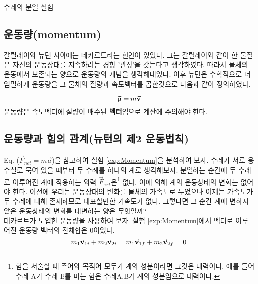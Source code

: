 \begin{flushleft}
\begin{exper}{ \Large {수레의 분열 실험} }
\begin{enumerate}
\end{enumerate}
\end{exper}


\subsection{운동량(momentum)}


갈릴레이와 뉴턴 사이에는 데카르트라는 현인이 있었다. 그는 갈릴레이와 같이 한 물질은 자신의 운동상태를 
지속하려는 경향 '관성'을 갖는다고 생각하였다. 따라서 물체의 운동에서 보존되는 양으로 운동량의 개념을 생각해내었다. 
이후 뉴턴은 수학적으로 더 엄밀하게 운동량을 그 물체의 질량과 속도벡터를 곱한것으로 다음과 같이 정의하였다. 



  \begin{defn}[운동량]

\begin{equation}
  \va{p} = m\va{v}
\end{equation}
운동량은 속도벡터에 질량이 배수된 \textbf{벡터}임으로 계산에 주의해야 한다.  

  \end{defn}


\noindent



\subsection{운동량과 힘의 관계(뉴턴의 제2 운동법칙)}
  
Eq. ($\vec{F}_{net}=m\vec{a}$)을 참고하여 실험 \ref{exp:Momentum}을 분석하여 보자. 
수레가 서로 용수철로 묵여 있을 때부터 두 수례를 하나의 계로 생각해보자.
 분열하는 순간에 두 수레로 이루어진 계에 작용하는 외력 $\vec{F}_{ext}$은\footnote{힘을 서술할 때 주어와 목적어 모두가 
계의 성분이라면 그것은 내력이다. 예를 들어 수레 A가 수레 B를 미는 힘은 수레A,B가 계의 성분임으로 내력이다.} 없다. 이에 의해 
계의 운동상태의 변화는 없어야 한다. 이전에 우리는 운동상태의 변화를 물체의 가속도로 두었으나 
이제는 가속도가 두 수레에 대해 존재하므로 대표할만한 가속도가 없다. 그렇다면 그 순간 계에 변하지 않은 운동상태의 변화를 대변하는 양은 무엇일까? \\
데카르트가 도입한 운동량을 사용하여 보자. 실험 \ref{exp:Momentum}에서 벡터로 이루어진 운동량 벡터의 전체합은 0이었다.
\begin{equation}
  m_1\va{v}_{1i}+m_2\va{v}_{2i}=m_1\va{v}_{1f}+m_2\va{v}_{2f}=0
\end{equation}




\end{flushleft}
